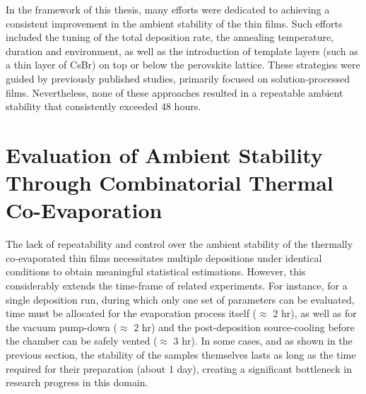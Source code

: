 In the framework of this thesis, many efforts were dedicated to achieving a consistent improvement in the ambient stability of the  thin films. Such efforts included the tuning of the total deposition rate, the annealing temperature, duration and environment, as well as the introduction of template layers (such as a thin layer of CsBr) on top or below the perovskite lattice. These strategies were guided by previously published studies, primarily focused on solution-processed films. Nevertheless, none of these approaches resulted in a repeatable ambient stability that consistently exceeded 48 hours.


\section{Evaluation of Ambient Stability Through Combinatorial Thermal Co-Evaporation}

The lack of repeatability and control over the ambient stability of the thermally co-evaporated  thin films necessitates multiple depositions under identical conditions to obtain meaningful statistical estimations. However, this considerably extends the time-frame of related experiments. For instance, for a single deposition run, during which only one set of parameters can be evaluated, time must be allocated for the evaporation process itself ($\approx$ 2 hr), as well as for the vacuum pump-down ($\approx$ 2 hr) and the post-deposition source-cooling before the chamber can be safely vented ($\approx$ 3 hr). In some cases, and as shown in the previous section, the stability of the samples themselves lasts as long as the time required for their preparation (about 1 day), creating a significant bottleneck in research progress in this domain.  

